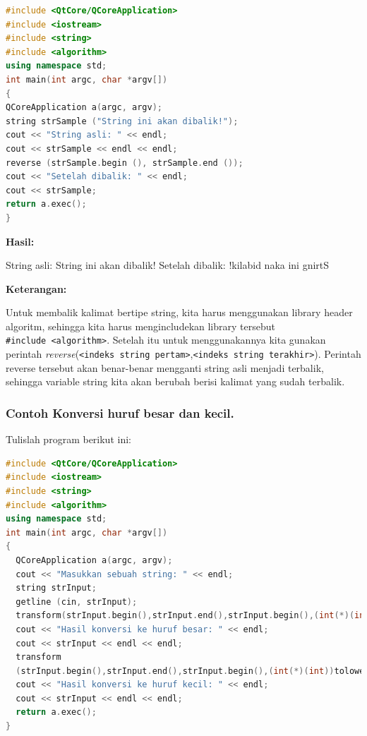 \begin{lstlisting}[language=c++, caption=Membalik kata / kalimat, label=contoh3-29]
#include <QtCore/QCoreApplication>
#include <iostream>
#include <string>
#include <algorithm>
using namespace std;
int main(int argc, char *argv[])
{
QCoreApplication a(argc, argv);
string strSample ("String ini akan dibalik!");
cout << "String asli: " << endl;
cout << strSample << endl << endl;
reverse (strSample.begin (), strSample.end ());
cout << "Setelah dibalik: " << endl;
cout << strSample;
return a.exec();
}
\end{lstlisting}

\textbf{Hasil:}

\begin{lcverbatim}
String asli:
String ini akan dibalik!
Setelah dibalik:
!kilabid naka ini gnirtS
\end{lcverbatim}

\textbf{Keterangan:}

Untuk membalik kalimat bertipe string, kita harus menggunakan library
header algoritm, sehingga kita harus mengincludekan library tersebut
\texttt{\#include\ \textless{}algorithm\textgreater{}}. Setelah itu
untuk menggunakannya kita gunakan perintah
\emph{reverse}(\texttt{\textless{}indeks\ string\ pertam\textgreater{}},\texttt{\textless{}indeks\ string\ terakhir\textgreater{}}).
Perintah reverse tersebut akan benar-benar mengganti string asli menjadi
terbalik, sehingga variable string kita akan berubah berisi kalimat yang
sudah terbalik.

\subsubsection*{Contoh  Konversi huruf besar dan kecil.}

Tulislah program berikut ini:

\begin{lstlisting}[language=c++, caption=Konversi huruf besar dan kecil, label=contoh3-30]
#include <QtCore/QCoreApplication>
#include <iostream>
#include <string>
#include <algorithm>
using namespace std;
int main(int argc, char *argv[])
{
  QCoreApplication a(argc, argv);
  cout << "Masukkan sebuah string: " << endl;
  string strInput;
  getline (cin, strInput);
  transform(strInput.begin(),strInput.end(),strInput.begin(),(int(*)(int))toupper);
  cout << "Hasil konversi ke huruf besar: " << endl;
  cout << strInput << endl << endl;
  transform
  (strInput.begin(),strInput.end(),strInput.begin(),(int(*)(int))tolower);
  cout << "Hasil konversi ke huruf kecil: " << endl;
  cout << strInput << endl << endl;
  return a.exec();
}
\end{lstlisting}

